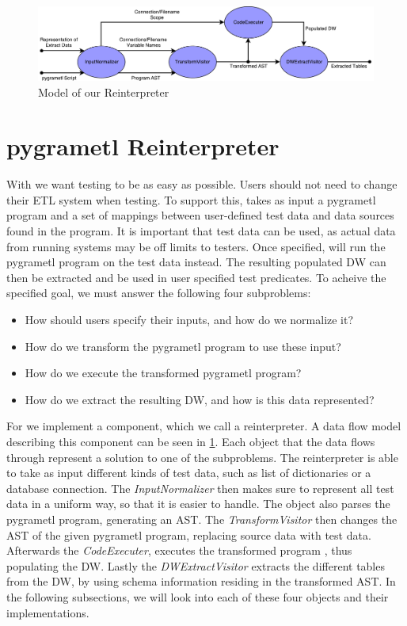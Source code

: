 \begin{figure}
  \centering
  \includegraphics[width=1\textwidth]{figures/reinterpreter_model.pdf}
  \caption{Model of our Reinterpreter}
  \label{fig:reinterpreter}
\end{figure}

\section{pygrametl Reinterpreter}
With  \FW we want testing to be as easy as possible. Users should not need to  change their ETL system when testing. To support this, \FW takes as input a pygrametl program and a set of mappings between user-defined test data and data sources found in the program. It is important that test data can be used, as actual data from running systems may be off limits to testers. Once specified, \FW will run the pygrametl program on the test data instead. The resulting populated DW can then be extracted and be used in user specified test predicates. To acheive the specified goal, we must answer the following four subproblems: 

\begin{itemize}
\item How should users specify their inputs, and how do we normalize it?
\item How do we transform the pygrametl program to use these input?
\item How do we execute the transformed pygrametl program?
\item How do we extract the resulting DW, and how is this data represented? 
\end{itemize}

For \FW we implement a component, which we call a reinterpreter. A data flow model describing this component can be seen in \cref{fig:reinterpreter}. Each object that the data flows through represent a solution to one of the subproblems. The reinterpreter is able to take as input different kinds of test data, such as list of dictionaries or a database connection. The \textit{InputNormalizer} then makes sure to represent all test data in a uniform way, so that it is easier to handle. The object also parses the pygrametl program, generating an AST. The \textit{TransformVisitor} then changes the AST of the given pygrametl program, replacing source data with test data. Afterwards the \textit{CodeExecuter}, executes the transformed program , thus populating the DW. Lastly the \textit{DWExtractVisitor} extracts the different tables from the DW, by using schema information residing in the transformed AST. In the following subsections, we will look into each of these four objects and their implementations.

